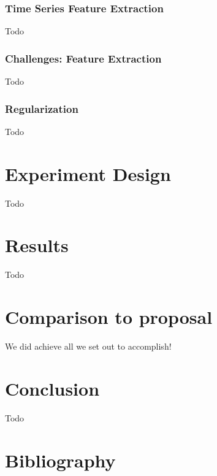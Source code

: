 \documentclass[11pt,letterpaper]{article}
\begin{document}
\subsubsection{Time Series Feature Extraction}
Todo
\subsubsection{Challenges: Feature Extraction}
Todo
\subsubsection{Regularization}
Todo

\section{Experiment Design}
Todo
\section{Results}
Todo

\section{Comparison to proposal}
We did achieve all we set out to accomplish!

\section{Conclusion}
Todo



\section*{Bibliography}


%
%
\end{document}
